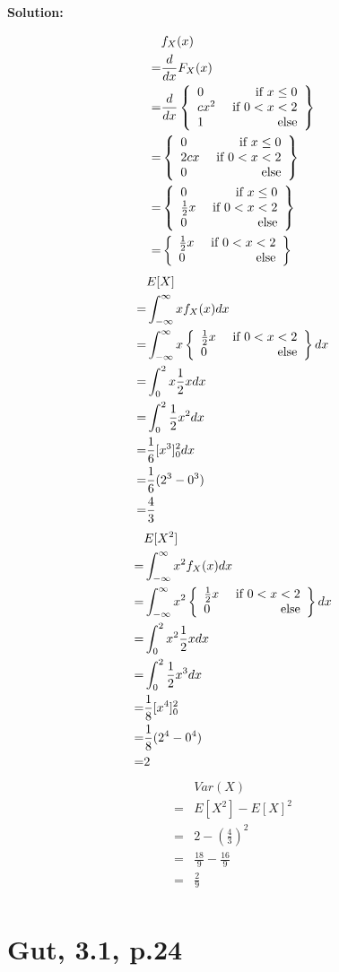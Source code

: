 \documentclass{article}
\begin{document}
\textbf{Solution:}

\begin{align*}
	 & f_X(x) \\
	=& \frac{d}{dx}F_X(x) \\
	=& \frac{d}{dx}\left\{\begin{array}{lr}0 & \text{ if }x\leq 0\\ cx^2 & \text{ if }0<x<2 \\1 & \text{ else}\end{array}\right\} \\
	=& \left\{\begin{array}{lr}0 & \text{ if }x\leq 0\\ 2cx & \text{ if }0<x<2 \\0 & \text{ else}\end{array}\right\} \\
	=& \left\{\begin{array}{lr}0 & \text{ if }x\leq 0\\ \frac12x & \text{ if }0<x<2 \\0 & \text{ else}\end{array}\right\} \\
	=& \left\{\begin{array}{lr}\frac12x & \text{ if }0<x<2\\0 & \text{ else}\end{array}\right\} \\
\end{align*}
\begin{align*}
	 & E[X] \\
	=& \int_{-\infty}^\infty x f_X(x)dx \\
	=& \int_{-\infty}^\infty x \left\{\begin{array}{lr}\frac12x & \text{ if }0<x<2\\0 & \text{ else}\end{array}\right\}dx \\
	=& \int_{0}^2 x \frac12x dx \\
	=& \int_{0}^2 \frac12x^2 dx \\
	=& \frac16\lbrack x^3\rbrack_0^2 dx \\
	=& \frac16(2^3-0^3) \\
	=& \frac{4}{3} \\
\end{align*}
\begin{align*}
	 & E[X^2] \\
	=& \int_{-\infty}^\infty x^2 f_X(x)dx \\
	=& \int_{-\infty}^\infty x^2 \left\{\begin{array}{lr}\frac12x & \text{ if }0<x<2\\0 & \text{ else}\end{array}\right\}dx \\
	=& \int_{0}^2 x^2 \frac12x dx \\
	=& \int_{0}^2 \frac12x^3 dx \\
	=& \frac18\lbrack x^4\rbrack_0^2 \\
	=& \frac18(2^4-0^4) \\
	=& 2 \\
\end{align*}
\begin{align*}
	 & Var(X) \\
	=& E[X^2]-E[X]^2 \\
	=& 2-\left(\frac{4}{3}\right)^2 \\
	=& \frac{18}{9}-\frac{16}{9} \\
	=& \frac{2}{9} \\
\end{align*}

\section{Gut, 3.1, p.24}
\end{document}
